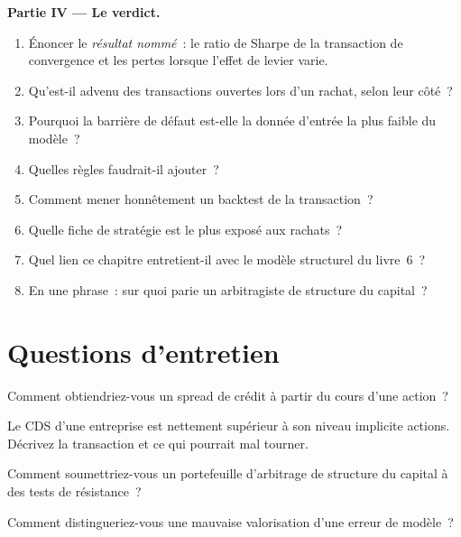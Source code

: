 \begin{problem}
\medskip\noindent\textbf{Partie IV --- Le verdict.}
\begin{enumerate}[resume]
\item Énoncer le \emph{résultat nommé}~: le ratio de Sharpe de la transaction de convergence et les pertes lorsque l'effet de levier varie.
\item Qu'est-il advenu des transactions ouvertes lors d'un rachat, selon leur côté~?
\item Pourquoi la barrière de défaut est-elle la donnée d'entrée la plus faible du modèle~?
\item Quelles règles faudrait-il ajouter~?
\item Comment mener honnêtement un backtest de la transaction~?
\item Quelle fiche de stratégie est le plus exposé aux rachats~?
\item Quel lien ce chapitre entretient-il avec le modèle structurel du livre~6~?
\item En une phrase~: sur quoi parie un arbitragiste de structure du capital~?
\end{enumerate}
\end{problem}

\section{Questions d'entretien}

\begin{interviewq}\label{iq:s2:capital-structure-arbitrage:1}
Comment obtiendriez-vous un spread de crédit à partir du cours d'une action~?
\end{interviewq}

\begin{interviewq}\label{iq:s2:capital-structure-arbitrage:2}
Le CDS d'une entreprise est nettement supérieur à son niveau implicite actions. Décrivez la transaction et ce qui pourrait mal tourner.
\end{interviewq}

\begin{interviewq}\label{iq:s2:capital-structure-arbitrage:3}
Comment soumettriez-vous un portefeuille d'arbitrage de structure du capital à des tests de résistance~?
\end{interviewq}

\begin{interviewq}\label{iq:s2:capital-structure-arbitrage:4}
Comment distingueriez-vous une mauvaise valorisation d'une erreur de modèle~?
\end{interviewq}

